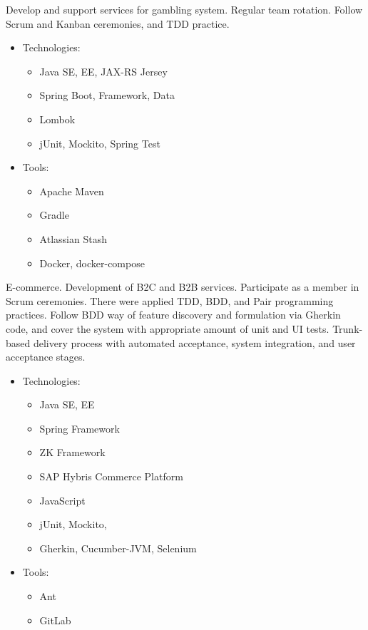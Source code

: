 \documentclass[11pt, a4paper]{moderncv}
\begin{document}
{Develop and support services for gambling system. Regular team rotation. Follow Scrum and Kanban ceremonies, and TDD practice. 
\begin{itemize}
\item Technologies:
\begin{itemize}
\item Java SE, EE, JAX-RS Jersey
\item Spring Boot, Framework, Data
\item Lombok 
\item jUnit, Mockito, Spring Test
\end{itemize}
\item Tools:
\begin{itemize}
\item Apache Maven
\item Gradle
\item Atlassian Stash
\item Docker, docker-compose
\end{itemize}
\end{itemize}}

{E-commerce. Development of B2C and B2B services. Participate as a member in Scrum ceremonies. There were applied TDD, BDD, and Pair programming practices. Follow BDD way of feature discovery and formulation via Gherkin code, and cover the system with appropriate amount of unit and UI tests. Trunk-based delivery process with automated acceptance, system integration, and user acceptance stages.
\begin{itemize}
\item Technologies:
\begin{itemize}
\item Java SE, EE
\item Spring Framework
\item ZK Framework
\item SAP Hybris Commerce Platform
\item JavaScript
\item jUnit, Mockito, 
\item Gherkin, Cucumber-JVM, Selenium
\end{itemize}
\item Tools:
\begin{itemize}
\item Ant
\item GitLab
\end{itemize}
\end{itemize}}
\end{document}
